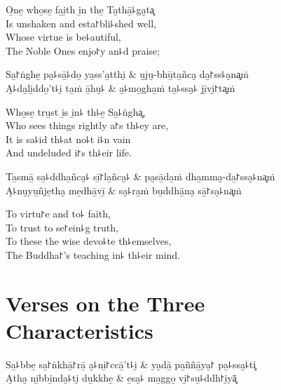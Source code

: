 \begin{english}
  O̱ne̱ who̱se̱ fa̱i̱th i̱n the̱ Ta̮thā̱꜕ga̮ta͓\\
  Is unshaken and esta꜓bli꜕shed well,\\
  Whose virtue is be꜕autiful,\\
  The Noble Ones enjo꜓y an꜕d praise;
\end{english}

\begin{twochants}
  Sa̱꜓ṅghe̱ pa̮꜕sā̱꜕do̱ ya̱ss'a̱tthi̮ & u̮ju̮-bhū̱ta̱ñca̮ da̱꜓ss꜕a̮na͓ṁ \\
  A̮꜕da̮li̱ddo̱'t꜕i̮ ta̱ṁ ā̱hu̮꜕ & a̮꜕mo̱gha̱ṁ ta̱꜕ssa̮꜕ jī̱vi̮꜓ta͓ṁ \\
\end{twochants}

\begin{english}
  Who̱se̱ tru̱st i̱s i̱n꜕ th꜕e̱ Sa̱꜕ṅgha͓,\\
  Who sees things rightly a꜓s th꜕ey are,\\
  It is sa꜕id th꜕at no꜕t i꜕n vain\\
  And undeluded i꜓s th꜕eir life.
\end{english}

\begin{twochants}
  Ta̱smā̱ sa̱꜕ddha̱ñca̮꜕ sī̱꜓la̱ñca̮꜕ & pa̮sā̱da̱ṁ dha̱mma̮-da̱꜓ssa̮꜕na͓ṁ \\
  A̮꜕nu̮yu̱ñje̱tha̮ me̱dhā̱vī̱ & sa̮꜕ra̱ṁ bu̱ddhā̱na̮ sā̱꜓sa̮꜕na͓ṁ \\
\end{twochants}

\begin{english}
  To virtu꜓e and to꜕ faith,\\
  To trust to se꜓ein꜕g truth,\\
  To these the wise devo꜕te th꜕emselves,\\
  The Buddha꜓'s teaching in꜕ th꜕eir mind.
\end{english}

\chapter{Verses on the Three Characteristics}


\begin{leader}
\end{leader}

\begin{twochants}
  Sa̱꜕bbe̱ sa̱꜓ṅkhā̱꜓rā̱ a̮꜕ni̱꜓ccā̱'t꜕i̮ & ya̮dā̱ pa̱ññā̱ya̮꜓ pa̱꜕ssa̮꜕ti͓ \\
  A̮tha̮ ni̱bbi̱nda̮꜕ti̮ du̱kkhe̱ & e̱sa̮꜕ ma̱ggo̱ vi̮꜓su̱꜕ddh꜓i̮yā͓ \\
\end{twochants}

